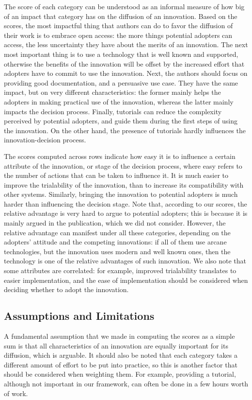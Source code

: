 \documentclass[12pt]{article}
\begin{document}
The score of each category can be understood as an informal measure of how big of an impact that category has on the diffusion of an innovation. Based on the scores, the most impactful thing that authors can do to favor the diffusion of their work is to embrace open access: the more things potential adopters can access, the less uncertainty they have about the merits of an innovation. The next most important thing is to use a technology that is well known and supported, otherwise the benefits of the innovation will be offset by the increased effort that adopters have to commit to use the innovation. Next, the authors should focus on providing good documentation, and a persuasive use case. They have the same impact, but on very different characteristics: the former mainly helps the adopters in making practical use of the innovation, whereas the latter mainly impacts the decision process. Finally, tutorials can reduce the complexity perceived by potential adopters, and guide them during the first steps of using the innovation. On the other hand, the presence of tutorials hardly influences the innovation-decision process.

The scores computed across rows indicate how easy it is to influence a certain attribute of the innovation, or stage of the decision process, where easy refers to the number of actions that can be taken to influence it. It is much easier to improve the trialability of the innovation, than to increase its compatibility with other systems. Similarly, bringing the innovation to potential adopters is much harder than influencing the decision stage. Note that, according to our scores, the relative advantage is very hard to argue to potential adopters; this is because it is mainly argued in the publication, which we did not consider. However, the relative advantage can manifest under all these categories, depending on the adopters' attitude and the competing innovations: if all of them use arcane technologies, but the innovation uses modern and well known ones, then the technology is one of the relative advantages of such innovation. We also note that some attributes are correlated: for example, improved trialability translates to easier implementation, and the ease of implementation should be considered when deciding whether to adopt the innovation.

\subsection{Assumptions and Limitations}
\label{sec:org80e02c8}
A fundamental assumption that we made in computing the scores as a simple sum is that all characteristics of an innovation are equally important for its diffusion, which is arguable. It should also be noted that each category takes a different amount of effort to be put into practice, so this is another factor that should be considered when weighting them. For example, providing a tutorial, although not important in our framework, can often be done in a few hours worth of work.
\end{document}
